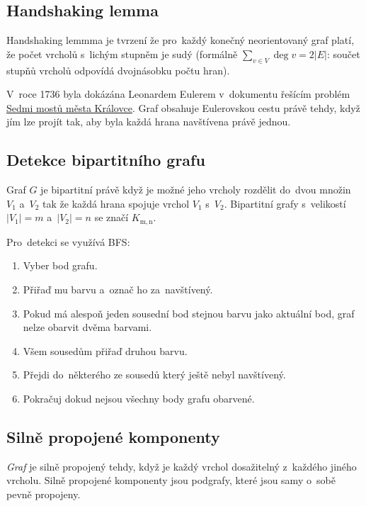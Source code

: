 \subsection{Handshaking lemma}

Handshaking lemmma je tvrzení že pro~každý konečný neorientovaný graf platí, že počet vrcholů s~lichým stupněm je sudý (formálně $\sum_{v \in V} \deg v = 2 |E|$: součet stupňů vrcholů odpovídá dvojnásobku počtu hran).

V~roce 1736 byla dokázána Leonardem Eulerem v~dokumentu řešícím problém \href{https://cs.wikipedia.org/wiki/Sedm_most%C5%AF_m%C4%9Bsta_Kr%C3%A1lovce}{Sedmi mostů města Královce}.
Graf obsahuje Eulerovskou cestu právě tehdy, když jím lze projít tak, aby byla každá hrana navštívena právě jednou.

\subsection{Detekce bipartitního grafu}

Graf $G$ je bipartitní právě když je možné jeho vrcholy rozdělit do~dvou množin $V_1$ a~$V_2$ tak že každá hrana spojuje vrchol $V_1$ s~$V_2$.
Bipartitní grafy s~velikostí $|V_1|=m$ a~$|V_2|=n$ se značí $K_\mathrm{m,n}$.

Pro~detekci se využívá BFS:

\begin{enumerate}
\item Vyber bod grafu.
\item Přiřaď mu barvu a~označ ho za~navštívený.
\item Pokud má alespoň jeden sousední bod stejnou barvu jako aktuální bod, graf nelze obarvit dvěma barvami.
\item Všem sousedům přiřaď druhou barvu.
\item Přejdi do~některého ze sousedů který ještě nebyl navštívený.
\item Pokračuj dokud nejsou všechny body grafu obarvené.
\end{enumerate}

\subsection{Silně propojené komponenty}

\emph{Graf} je silně propojený tehdy, když je každý vrchol dosažitelný z~každého jiného vrcholu.
Silně propojené komponenty jsou podgrafy, které jsou samy o~sobě pevně propojeny.

